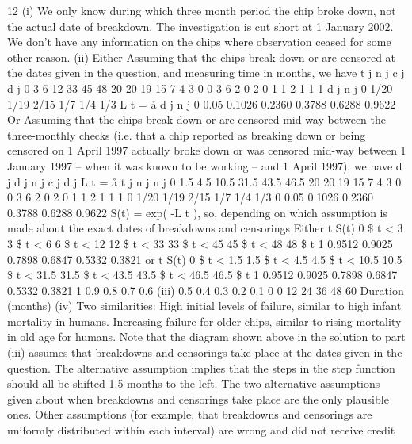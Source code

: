 \documentclass[a4paper,12pt]{article}
\begin{document}
12
(i)
We only know during which three month period the chip broke down, not the
actual date of breakdown.
The investigation is cut short at 1 January 2002.
We don’t have any information on the chips where observation ceased for
some other reason.
(ii)
Either
Assuming that the chips break down or are censored at the dates given in the
question, and measuring time in months, we have
t j n j c j d j
0
3
6
12
33
45
48 20
20
19
15
7
4
3 0
0
3
6
2
0
2 0
1
1
2
1
1
1
d j
n j
0
1/20
1/19
2/15
1/7
1/4
1/3
L t = å
d j
n j
0
0.05
0.1026
0.2360
0.3788
0.6288
0.9622
Or
Assuming that the chips break down or are censored mid-way between the
three-monthly checks (i.e. that a chip reported as breaking down or being
censored on 1 April 1997 actually broke down or was censored mid-way
between 1 January 1997 – when it was known to be working – and 1 April
1997), we have
d j
d j
n j
c j
d j
L t = å
t j
n j
n j
0
1.5
4.5
10.5
31.5
43.5
46.5
20
20
19
15
7
4
3
0
0
3
6
2
0
2
0
1
1
2
1
1
1
0
1/20
1/19
2/15
1/7
1/4
1/3
0
0.05
0.1026
0.2360
0.3788
0.6288
0.9622
S(t) = exp( -L t ),
so, depending on which assumption is made about the exact dates of
breakdowns and censorings
Either
t S(t)
0 \$ t < 3
3 \$ t < 6
6 \$ t < 12
12 \$ t < 33
33 \$ t < 45
45 \$ t < 48
48 \$ t 1
0.9512
0.9025
0.7898
0.6847
0.5332
0.3821
or
t S(t)
0 \$ t < 1.5
1.5 \$ t < 4.5
4.5 \$ t < 10.5
10.5 \$ t < 31.5
31.5 \$ t < 43.5
43.5 \$ t < 46.5
46.5 \$ t 1
0.9512
0.9025
0.7898
0.6847
0.5332
0.3821
1
0.9
0.8
0.7
0.6
(iii)
0.5
0.4
0.3
0.2
0.1
0
0
12
24
36
48
60
Duration (months)
(iv)
Two similarities:
High initial levels of failure, similar to high infant mortality in humans.
Increasing failure for older chips, similar to rising mortality in old age for
humans.
Note that the diagram shown above in the solution to part (iii) assumes that
breakdowns and censorings take place at the dates given in the question. The
alternative assumption implies that the steps in the step function should all be shifted
1.5 months to the left.
The two alternative assumptions given about when breakdowns and censorings take
place are the only plausible ones. Other assumptions (for example, that breakdowns
and censorings are uniformly distributed within each interval) are wrong and did not
receive credit
\end{document}
